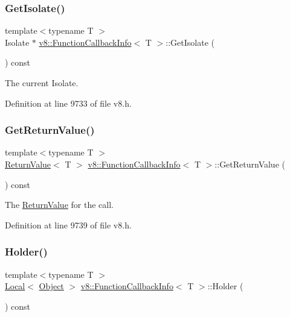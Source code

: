 \subsubsection{\texorpdfstring{Get\+Isolate()}{GetIsolate()}}
{\footnotesize\ttfamily template$<$typename T $>$ \\
Isolate $\ast$ \mbox{\hyperlink{classv8_1_1FunctionCallbackInfo}{v8\+::\+Function\+Callback\+Info}}$<$ T $>$\+::Get\+Isolate (\begin{DoxyParamCaption}{ }\end{DoxyParamCaption}) const}

The current Isolate. 

Definition at line 9733 of file v8.\+h.

\mbox{\label{classv8_1_1FunctionCallbackInfo_a2cb41afe1e098a46d27d901b4cc1e6f5}} 
\subsubsection{\texorpdfstring{Get\+Return\+Value()}{GetReturnValue()}}
{\footnotesize\ttfamily template$<$typename T $>$ \\
\mbox{\hyperlink{classv8_1_1ReturnValue}{Return\+Value}}$<$ T $>$ \mbox{\hyperlink{classv8_1_1FunctionCallbackInfo}{v8\+::\+Function\+Callback\+Info}}$<$ T $>$\+::Get\+Return\+Value (\begin{DoxyParamCaption}{ }\end{DoxyParamCaption}) const}

The \mbox{\hyperlink{classv8_1_1ReturnValue}{Return\+Value}} for the call. 

Definition at line 9739 of file v8.\+h.

\mbox{\label{classv8_1_1FunctionCallbackInfo_a708ab465862ed796e3b0b3c37ba05044}} 
\subsubsection{\texorpdfstring{Holder()}{Holder()}}
{\footnotesize\ttfamily template$<$typename T $>$ \\
\mbox{\hyperlink{classv8_1_1Local}{Local}}$<$ \mbox{\hyperlink{classv8_1_1Object}{Object}} $>$ \mbox{\hyperlink{classv8_1_1FunctionCallbackInfo}{v8\+::\+Function\+Callback\+Info}}$<$ T $>$\+::Holder (\begin{DoxyParamCaption}{ }\end{DoxyParamCaption}) const}

